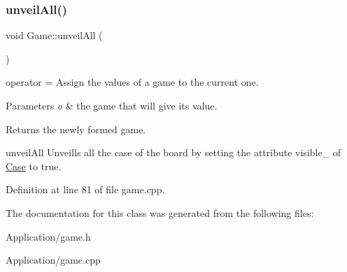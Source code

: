 \mbox{\label{class_game_a5423ce2b75acf6435cdea79c8c2b2112}} 
\subsubsection{\texorpdfstring{unveil\+All()}{unveilAll()}}
{\footnotesize\ttfamily void Game\+::unveil\+All (\begin{DoxyParamCaption}{ }\end{DoxyParamCaption})}



operator = Assign the values of a game to the current one. 


\begin{DoxyParams}{Parameters}
{\em o} & the game that will give its value. \\
\hline
\end{DoxyParams}
\begin{DoxyReturn}{Returns}
the newly formed game.
\end{DoxyReturn}
unveil\+All Unveills all the case of the board by setting the attribute visible\+\_\+ of \hyperlink{class_case}{Case} to true. 

Definition at line 81 of file game.\+cpp.



The documentation for this class was generated from the following files\+:\begin{DoxyCompactItemize}
\item 
Application/game.\+h\item 
Application/game.\+cpp\end{DoxyCompactItemize}

